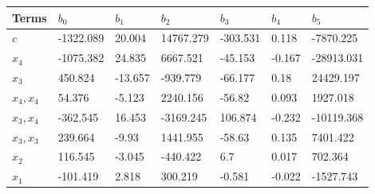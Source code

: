 \begin{tabular}{lllllll}
Terms & $b_0$ & $b_1$ & $b_2$ & $b_3$ & $b_4$ & $b_5$ \\ 
\hline 
$c$ & -1322.089 & 20.004 & 14767.279 & -303.531 & 0.118 & -7870.225 \\ 
$x_4$ & -1075.382 & 24.835 & 6667.521 & -45.153 & -0.167 & -28913.031 \\ 
$x_3$ & 450.824 & -13.657 & -939.779 & -66.177 & 0.18 & 24429.197 \\ 
$x_4,x_4$ & 54.376 & -5.123 & 2240.156 & -56.82 & 0.093 & 1927.018 \\ 
$x_3,x_4$ & -362.545 & 16.453 & -3169.245 & 106.874 & -0.232 & -10119.368 \\ 
$x_3,x_3$ & 239.664 & -9.93 & 1441.955 & -58.63 & 0.135 & 7401.422 \\ 
$x_2$ & 116.545 & -3.045 & -440.422 & 6.7 & 0.017 & 702.364 \\ 
$x_1$ & -101.419 & 2.818 & 300.219 & -0.581 & -0.022 & -1527.743 \\ 
\hline 
\end{tabular}